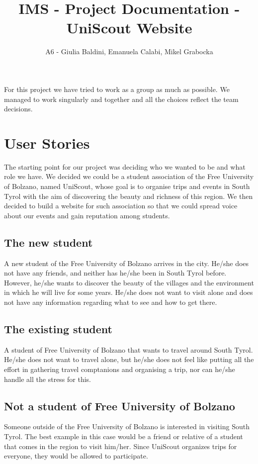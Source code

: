 \documentclass[a4paper]{article}
\title{IMS - Project Documentation - UniScout Website}
\author{A6 - Giulia Baldini, Emanuela Calabi, Mikel Grabocka}
\begin{document}
	\maketitle
	
	\noindent For this project we have tried to work as a group as much as possible. We managed to work singularly and together and all the choices reflect the team decisions.
	
	\section{User Stories}
	The starting point for our project was deciding who we wanted to be and what role we have. We decided we could be a student association of the Free University of Bolzano, named UniScout, whose goal is to organise trips and events in South Tyrol with the aim of discovering the beauty and richness of this region. We then decided to build a website for such association so that we could spread voice about our events and gain reputation among students.
	\subsection{The new student}
	A new student of the Free University of Bolzano arrives in the city. He/she does not have any friends, and neither has he/she been in South Tyrol before. However, he/she wants to discover the beauty of the villages and the environment in which he will live for some years. He/she does not want to visit alone and does not have any information regarding what to see and how to get there.
	\subsection{The existing student }
	A student of Free University of Bolzano that wants to travel around South Tyrol. He/she does not want to travel alone, but he/she does not feel like putting all the effort in gathering travel comptanions and organising a trip, nor can he/she handle all the stress for this.
	\subsection{Not a student of Free University of Bolzano}
	Someone outside of the Free University of Bolzano is interested in visiting South Tyrol. The best example in this case would be a friend or relative of a student that comes in the region to visit him/her. Since UniScout organizes trips for everyone, they would be allowed to participate.
	
\end{document}
